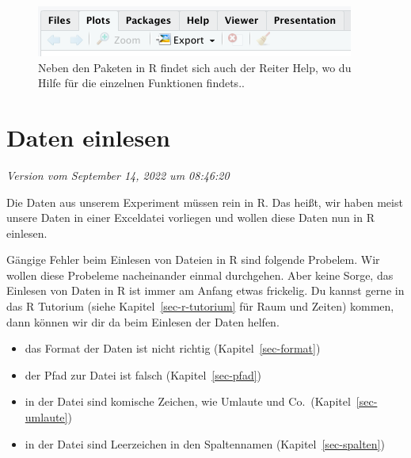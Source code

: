 \documentclass[
  letterpaper,
]{scrbook}
\providecommand{\tightlist}{%
  \setlength{\itemsep}{0pt}\setlength{\parskip}{0pt}}\usepackage{longtable,booktabs,array}
\begin{document}
\begin{figure}

{\centering \includegraphics{./images/basics-help.png}

}

\caption{\label{fig-basic-01}Neben den Paketen in R findet sich auch der
Reiter Help, wo du Hilfe für die einzelnen Funktionen findets..}

\end{figure}

\hypertarget{sec-programming-import}{%
\chapter{Daten einlesen}\label{sec-programming-import}}

\emph{Version vom September 14, 2022 um 08:46:20}


Die Daten aus unserem Experiment müssen rein in R. Das heißt, wir haben
meist unsere Daten in einer Exceldatei vorliegen und wollen diese Daten
nun in R einlesen.

Gängige Fehler beim Einlesen von Dateien in R sind folgende Probelem.
Wir wollen diese Probeleme nacheinander einmal durchgehen. Aber keine
Sorge, das Einlesen von Daten in R ist immer am Anfang etwas frickelig.
Du kannst gerne in das R Tutorium (siehe Kapitel~\ref{sec-r-tutorium}
für Raum und Zeiten) kommen, dann können wir dir da beim Einlesen der
Daten helfen.

\begin{itemize}
\tightlist
\item
  das Format der Daten ist nicht richtig (Kapitel~\ref{sec-format})
\item
  der Pfad zur Datei ist falsch (Kapitel~\ref{sec-pfad})
\item
  in der Datei sind komische Zeichen, wie Umlaute und
  Co.~(Kapitel~\ref{sec-umlaute})
\item
  in der Datei sind Leerzeichen in den Spaltennamen
  (Kapitel~\ref{sec-spalten})
\end{itemize}
\end{document}

